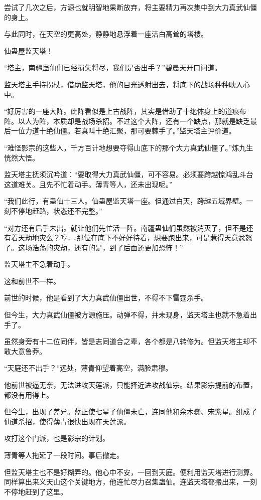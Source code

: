 \begin{this_body}
尝试了几次之后，方源也就明智地果断放弃，将主要精力再次集中到大力真武仙僵的身上。

与此同时，在天空的更高处，静静地悬浮着一座洁白高耸的塔楼。

仙蛊屋监天塔！

“塔主，南疆蛊仙们已经损失将尽，我们是否出手？”碧晨天开口问道。

监天塔主手持拐杖，借助监天塔，他的目光透射出去，将底下的战场种种映入心中。

“好厉害的一座大阵。此阵看似是上古战阵，其实是借助了十绝体身上的道痕布阵。以人为阵，本质却是战场杀招。不过这个大阵，还有一个缺点，那就是缺乏最后一位力道十绝仙僵。若真叫十绝汇聚，那可要棘手了。”监天塔主评价道。

“难怪影宗的这些人，千方百计地想要夺得山底下的那个大力真武仙僵了。”炼九生恍然大悟。

监天塔主抚须沉吟道：“要取得大力真武仙僵，可不容易。必须要跨越惊鸿乱斗台这道难关。且先不忙着动手。薄青等人，还未出现呢。”

“我们此行，有蛊仙十三人。仙蛊屋监天塔一座。但通过白天，跨越五域界壁。一刻不停地赶路，状态还不完整。”

“对方还有后手未出。就让他们先忙活一阵。南疆蛊仙们虽然被消灭了，但不是还有着天劫地灾么？哼……那位在底下不好好待着，想要跑出来，可是惹得天意忿怒了。这场浩荡的灾劫，还有的是，到了后面还更加恐怖！”

监天塔主不急着动手。

这和前世不一样。

前世的时候，他是看到了大力真武仙僵出世，不得不下雷霆杀手。

但今生，大力真武仙僵被方源施压。动弹不得，并未现身，监天塔主也就不急着出手了。

虽然身旁有十二位同伴，皆是志同道合之辈，各个都是八转修为。但监天塔主却不敢大意鲁莽。

“天庭还不出手？”远处，薄青仰望着高空，满脸肃穆。

他前世被逼无奈，无法进攻天莲派，只能择近进攻战仙宗。结果影宗提前的布置，都没有用得上。

但今生，出现了差异。蓝正使七星子仙僵未亡，连同他和余木蠢、宋紫星。组成了仙道杀招，使得薄青很快出现在天莲派。

攻打这个门派，也是影宗的计划。

薄青等人拖延了一段时间。事后撤走。

但监天塔主也不是好糊弄的。他心中不安，一回到天庭。便利用监天塔进行测算。同样算出来义天山这个关键地方，他连忙尽力召集蛊仙。连监天塔都搬出来，一刻不停地赶到了这里。


\end{this_body}
